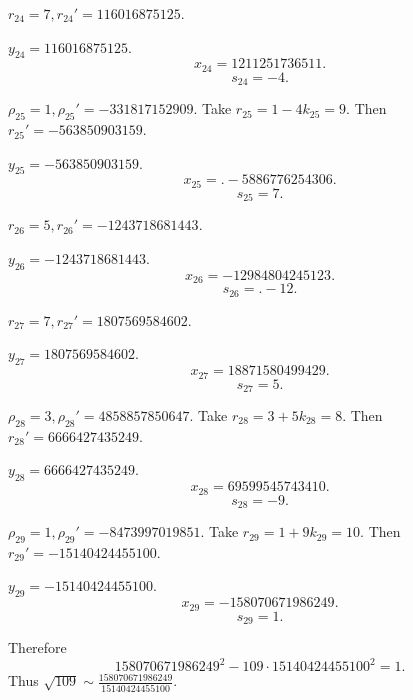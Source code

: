 \documentclass{article}
\theoremstyle{definition}
\begin{document}
$r_{24}=7, r_{24}'=116016875125$.

$y_{24}=116016875125$.
\[
x_{24} = 1211251736511.
\]
\[
s_{24} = -4.
\]

$\rho_{25}=1, \rho_{25}'=-331817152909$.
Take $r_{25}=1-4k_{25}=9$. Then
$r_{25}'=-563850903159$.

$y_{25}=-563850903159$.
\[
x_{25} = .-5886776254306.
\]
\[
s_{25} = 7.
\]

$r_{26}=5, r_{26}'=-1243718681443$.

$y_{26}=-1243718681443$.
\[
x_{26} = -12984804245123.
\]
\[
s_{26} = .-12.
\]

$r_{27}=7, r_{27}'=1807569584602$.

$y_{27}=1807569584602$.
\[
x_{27} = 18871580499429.
\]
\[
s_{27} = 5.
\]

$\rho_{28}=3, \rho_{28}'=4858857850647$.
Take $r_{28}=3+5k_{28}=8$. Then
$r_{28}'=6666427435249$.

$y_{28}=6666427435249$.
\[
x_{28} = 69599545743410.
\]
\[
s_{28} = -9.
\]

$\rho_{29}=1, \rho_{29}'=-8473997019851$.
Take $r_{29}=1+9k_{29}=10$.
Then $r_{29}'=-15140424455100$.

$y_{29}=-15140424455100$.
\[
x_{29} = -158070671986249.
\]
\[
s_{29} = 1.
\]

Therefore
\[
158070671986249^2 - 109 \cdot 15140424455100^2 = 1.
\]
Thus $\sqrt{109} \sim \frac{158070671986249}{15140424455100}$. 



\nocite{*}



\end{document}
